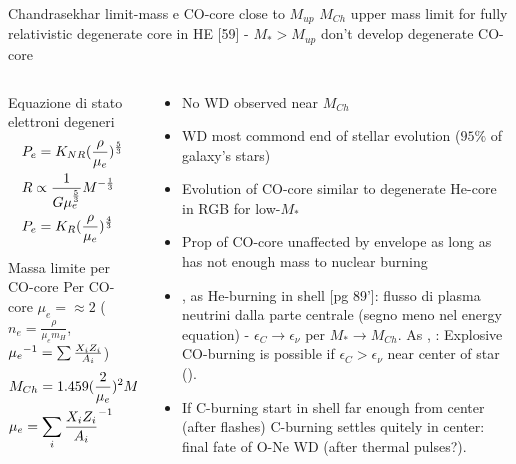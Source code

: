 \begin{frame}{Chandrasekhar limit-mass e CO-core close to $M_{up}$}
$M_{Ch}$ upper mass limit for fully relativistic degenerate core in HE [59] - $M_*>M_{up}$ don't develop degenerate CO-core
\begin{columns}[T]
\begin{column}{0.4\textwidth}
\begin{block}{Equazione di stato elettroni degeneri}
\begin{align*}
&P_e=K_{NR}(\frac{\rho}{\mu_e})^{\frac{5}{3}}\\
&R\propto \frac{1}{G\mu_e^{\frac{5}{3}}}M^{-\frac{1}{3}}\\
&P_e=K_R(\frac{\rho}{\mu_e})^{\frac{4}{3}}
\end{align*}
\end{block}
\begin{block}{Massa limite per CO-core}
Per CO-core $\mu_e=\approx2$ ($n_e=\frac{\rho}{\mu_em_H}$, ${\mu_e}^{-1}=\sum\frac{X_iZ_i}{A_i}$)
\begin{align*}
&M_{Ch}=1.459(\frac{2}{\mu_e})^2M_{\odot}=1.46M_{\odot}\\
&\mu_e={\sum_i\frac{X_iZ_i}{A_i}}^{-1}
\end{align*}
\end{block}
\end{column}
\begin{column}{0.45\textwidth}
\begin{itemize}
\item No WD observed near $M_{Ch}$
\item WD most commond end of stellar evolution ($95\%$ of galaxy's stars)
\item Evolution of CO-core similar to degenerate He-core in RGB for low-$M_*$
\item Prop of CO-core unaffected by envelope as long as has not enough mass to nuclear burning
\item {},  as He-burning in shell [pg 89']: flusso di plasma neutrini dalla parte centrale \xaumenta{\epsilon_{\nu}}(segno meno nel energy equation) - $\epsilon_C\to\epsilon_{\nu}$ per $M_*\to M_{Ch}$. As , : Explosive CO-burning is possible if $\epsilon_C>\epsilon_{\nu}$ near center of star ().

\item If C-burning start in shell far enough from center (after flashes) C-burning settles quitely in center: final fate of O-Ne WD (after thermal pulses?).
\end{itemize}
\end{column}
\end{columns}
\end{frame}

